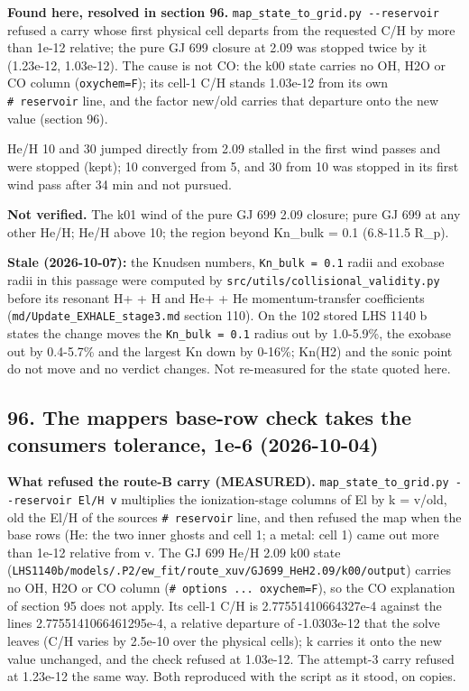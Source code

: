 \documentclass[english,a4paper]{my_memo}
\begin{document}
\textbf{Found here, resolved in section 96.} \texttt{map\_state\_to\_grid.py\ -\/-reservoir} refused a carry whose first physical cell departs from the
requested C/H by more than 1e-12 relative; the pure GJ 699 closure at 2.09
was stopped twice by it (1.23e-12, 1.03e-12). The cause is not CO: the k00
state carries no OH, H2O or CO column (\texttt{oxychem=F}); its cell-1 C/H stands
1.03e-12 from its own \texttt{\#\ reservoir} line, and the factor new/old carries that
departure onto the new value (section 96).

He/H 10 and 30 jumped directly from 2.09 stalled in the first wind passes
and were stopped (kept); 10 converged from 5, and 30 from 10 was stopped in
its first wind pass after 34 min and not pursued.

\textbf{Not verified.} The k01 wind of the pure GJ 699 2.09 closure; pure GJ 699
at any other He/H; He/H above 10; the region beyond Kn\_bulk = 0.1 (6.8-11.5
R\_p).

\textbf{Stale (2026-10-07):} the Knudsen numbers, \texttt{Kn\_bulk\ =\ 0.1} radii and exobase radii in this passage were computed by \texttt{src/utils/collisional\_validity.py} before its resonant H+ + H and He+ + He momentum-transfer coefficients (\texttt{md/Update\_EXHALE\_stage3.md} section 110). On the 102 stored LHS 1140 b states the change moves the \texttt{Kn\_bulk\ =\ 0.1} radius out by 1.0-5.9\%, the exobase out by 0.4-5.7\% and the largest Kn down by 0-16\%; Kn(H2) and the sonic point do not move and no verdict changes. Not re-measured for the state quoted here.

\subsection{96. The mapper\textquotesingle s base-row check takes the consumer\textquotesingle s tolerance, 1e-6 (2026-10-04)}\label{96-the-mappers-base-row-check-takes-the-consumers-tolerance-1e-6-2026-10-04}

\textbf{What refused the route-B carry (MEASURED).} \texttt{map\_state\_to\_grid.py\ -\/-reservoir\ El/H\ v} multiplies the ionization-stage columns of El by
k = v/old, old the El/H of the source\textquotesingle s \texttt{\#\ reservoir} line, and then refused
the map when the base rows (He: the two inner ghosts and cell 1; a metal:
cell 1) came out more than 1e-12 relative from v. The GJ 699 He/H 2.09 k00
state (\texttt{LHS1140b/models/.P2/ew\_fit/route\_xuv/GJ699\_HeH2.09/k00/output})
carries no OH, H2O or CO column (\texttt{\#\ options\ ...\ oxychem=F}), so the CO
explanation of section 95 does not apply. Its cell-1 C/H is
2.77551410664327e-4 against the line\textquotesingle s 2.7755141066461295e-4, a relative
departure of -1.0303e-12 that the solve leaves (C/H varies by 2.5e-10 over
the physical cells); k carries it onto the new value unchanged, and the
check refused at 1.03e-12. The attempt-3 carry refused at 1.23e-12 the same
way. Both reproduced with the script as it stood, on copies.
\end{document}

